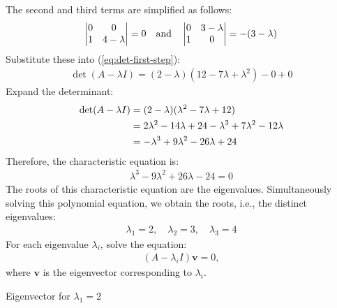 The second and third terms are simplified as follows:
\begin{align}
    \begin{vmatrix}
    0 & 0 \\
    1 & 4 - \lambda
    \end{vmatrix} = 0 \quad \text{and} \quad \begin{vmatrix}
    0 & 3 - \lambda \\
    1 & 0
    \end{vmatrix} = -(3 - \lambda)\notag
\end{align}
Substitute these into (\ref{eq:det-first-step}):
\begin{align}
    \det(A - \lambda I) = (2 - \lambda)(12 - 7\lambda + \lambda^2) - 0 + 0
\end{align}
Expand the determinant:
\begin{align}
    \det(A - \lambda I) &= (2 - \lambda)(\lambda^2 - 7\lambda + 12)\notag \\
    &= 2\lambda^2 - 14\lambda + 24 - \lambda^3 + 7\lambda^2 - 12\lambda\notag \\
    &= -\lambda^3 + 9\lambda^2 - 26\lambda + 24\notag
\end{align}
Therefore, the characteristic equation is:
\begin{align}
    \lambda^3 - 9\lambda^2 + 26\lambda - 24 =  0
\end{align}
The roots of this characteristic equation are the eigenvalues. Simultaneously solving this polynomial equation, we obtain the roots, i.e., the distinct eigenvalues:
\begin{align}
    \lambda_1 = 2, \quad \lambda_2 = 3, \quad \lambda_3 = 4
\end{align}
For each eigenvalue $\lambda_i$, solve the equation:
\begin{align}
    (A - \lambda_i I) \mathbf{v} = 0,
\end{align}
where $\mathbf{v}$ is the eigenvector corresponding to $\lambda_i$.

Eigenvector for $\lambda_1 = 2$

